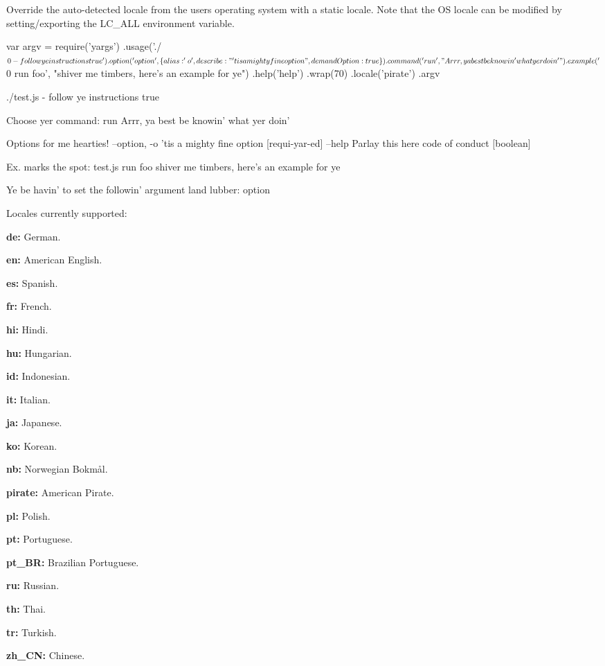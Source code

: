 Override the auto-\/detected locale from the user\textquotesingle{}s operating system with a static locale. Note that the OS locale can be modified by setting/exporting the {\ttfamily L\+C\+\_\+\+A\+LL} environment variable.


\begin{DoxyCode}
var argv = require('yargs')
  .usage('./$0 - follow ye instructions true')
  .option('option', \{
    alias: 'o',
    describe: "'tis a mighty fine option",
    demandOption: true
  \})
  .command('run', "Arrr, ya best be knowin' what yer doin'")
  .example('$0 run foo', "shiver me timbers, here's an example for ye")
  .help('help')
  .wrap(70)
  .locale('pirate')
  .argv
\end{DoxyCode}







\begin{DoxyCode}
./test.js - follow ye instructions true

Choose yer command:
  run  Arrr, ya best be knowin' what yer doin'

Options for me hearties!
  --option, -o  'tis a mighty fine option               [requi-yar-ed]
  --help        Parlay this here code of conduct             [boolean]

Ex. marks the spot:
  test.js run foo  shiver me timbers, here's an example for ye

Ye be havin' to set the followin' argument land lubber: option
\end{DoxyCode}


Locales currently supported\+:


\begin{DoxyItemize}
\item {\bfseries de\+:} German.
\item {\bfseries en\+:} American English.
\item {\bfseries es\+:} Spanish.
\item {\bfseries fr\+:} French.
\item {\bfseries hi\+:} Hindi.
\item {\bfseries hu\+:} Hungarian.
\item {\bfseries id\+:} Indonesian.
\item {\bfseries it\+:} Italian.
\item {\bfseries ja\+:} Japanese.
\item {\bfseries ko\+:} Korean.
\item {\bfseries nb\+:} Norwegian Bokmål.
\item {\bfseries pirate\+:} American Pirate.
\item {\bfseries pl\+:} Polish.
\item {\bfseries pt\+:} Portuguese.
\item {\bfseries pt\+\_\+\+BR\+:} Brazilian Portuguese.
\item {\bfseries ru\+:} Russian.
\item {\bfseries th\+:} Thai.
\item {\bfseries tr\+:} Turkish.
\item {\bfseries zh\+\_\+\+CN\+:} Chinese.
\end{DoxyItemize}


